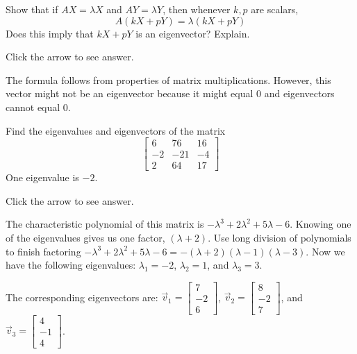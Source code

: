 \documentclass{ximera}
\begin{document}
\begin{problem}\label{prb:8.5} Show that if $AX=\lambda X$ and $AY=\lambda Y$, then whenever $k,p$ are scalars,
\begin{equation*}
A\left( kX+pY\right) =\lambda \left( kX+pY\right)
\end{equation*}
Does this imply that $kX+pY$ is an eigenvector? Explain.

Click the arrow to see answer.
\begin{expandable}
The formula follows from properties of matrix multiplications. However,
this vector might not be an eigenvector because it might equal $0$
and eigenvectors cannot equal $0$.
\end{expandable}
\end{problem}

\begin{problem}\label{prb:8.12} Find the eigenvalues and eigenvectors of the matrix
\begin{equation*}
\left[
\begin{array}{rrr}
6 & 76 & 16 \\
-2 & -21 & -4 \\
2 & 64 & 17
\end{array}
\right]
\end{equation*}
One eigenvalue is $-2.$

Click the arrow to see answer.
\begin{expandable}
The characteristic polynomial of this matrix is $-\lambda^3+2\lambda^2+5\lambda-6$.  Knowing one of the eigenvalues gives us one factor, $(\lambda+2)$.  Use long division of polynomials to finish factoring $-\lambda^3+2\lambda^2+5\lambda-6=-(\lambda+2)(\lambda-1)(\lambda-3)$.  Now we have the following eigenvalues: $\lambda_1=-2$, $\lambda_2=1$, and $\lambda_3=3$.

The corresponding eigenvectors are: $\vec{v}_1=\begin{bmatrix}7\\-2\\6\end{bmatrix}$, $\vec{v}_2=\begin{bmatrix}8\\-2\\7\end{bmatrix}$, and $\vec{v}_3=\begin{bmatrix}4\\-1\\4\end{bmatrix}$.
\end{expandable}
\end{problem}
\end{document}
